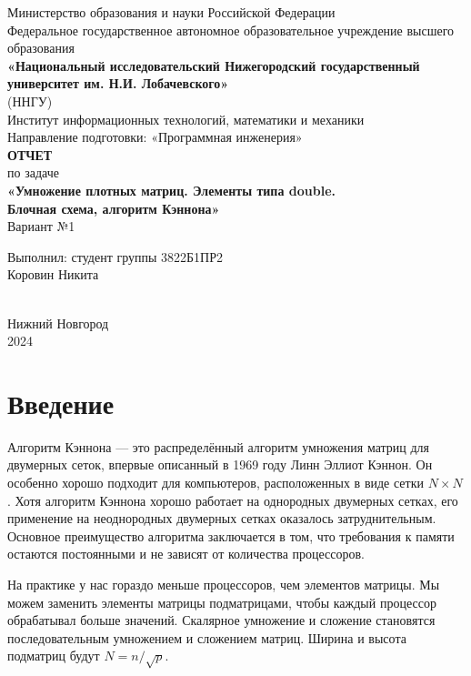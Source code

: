 \documentclass[12pt]{article}
\begin{document}
\begin{titlepage}
    \centering
    \large
    Министерство образования и науки Российской Федерации\\
    Федеральное государственное автономное образовательное учреждение высшего образования\\
    \textbf{«Национальный исследовательский Нижегородский государственный университет им. Н.И. Лобачевского»}\\
    (ННГУ)\\[1cm]
    Институт информационных технологий, математики и механики\\
    Направление подготовки: «Программная инженерия»\\[2cm]
    
    {\Large \textbf{ОТЧЕТ}}\\[0.5cm]
    {\Large по задаче}\\[0.5cm]
    {\Large \textbf{«Умножение плотных матриц. Элементы типа double.\\ Блочная схема, алгоритм Кэннона»}}\\[0.5cm]
    {\Large Вариант №1}\\[5cm]
    
    \hfill\parbox{0.5\textwidth}{
        Выполнил: студент группы 3822Б1ПР2\\
        Коровин Никита
    }\\[4cm]
    
    Нижний Новгород\\
    2024
\end{titlepage}

\thispagestyle{empty}
\clearpage
{} 
\setcounter{page}{2} 
\tableofcontents
\clearpage
\setcounter{page}{3} 
\section{Введение}

\hspace*{1.25em}Алгоритм Кэннона — это распределённый алгоритм умножения матриц для двумерных сеток, впервые описанный в 1969 году Линн Эллиот Кэннон. Он особенно хорошо подходит для компьютеров, расположенных в виде сетки $N \times N$. Хотя алгоритм Кэннона хорошо работает на однородных двумерных сетках, его применение на неоднородных двумерных сетках оказалось затруднительным. Основное преимущество алгоритма заключается в том, что требования к памяти остаются постоянными и не зависят от количества процессоров.

 На практике у нас гораздо меньше процессоров, чем элементов матрицы. Мы можем заменить элементы матрицы подматрицами, чтобы каждый процессор обрабатывал больше значений. Скалярное умножение и сложение становятся последовательным умножением и сложением матриц. Ширина и высота подматриц будут $N = n / \sqrt{p}$.
\end{document}
